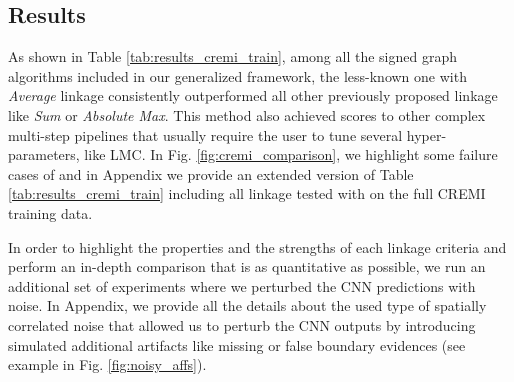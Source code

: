 


\subsection{Results}
As shown in Table \ref{tab:results_cremi_train}, among all the signed graph algorithms included in our generalized framework, the less-known one with \emph{Average} linkage consistently outperformed all other previously proposed linkage like \emph{Sum} or \emph{Absolute Max}. This method also achieved  scores to other complex multi-step pipelines that usually require the user to tune several hyper-parameters, like LMC. 
In Fig. \ref{fig:cremi_comparison}, we highlight some failure cases of \algname{} and in Appendix we provide an extended version of Table \ref{tab:results_cremi_train} including all linkage tested with \algname{} on the full CREMI training data. 

In order to highlight the properties and the strengths of each linkage criteria and  perform an in-depth comparison that is as quantitative as possible, we run an additional set of experiments where we perturbed the CNN predictions with noise. In Appendix, we provide all the details about the used type of spatially correlated noise that allowed us to perturb the CNN outputs by introducing simulated additional artifacts like missing or false boundary evidences (see example in Fig. \ref{fig:noisy_affs}).  

